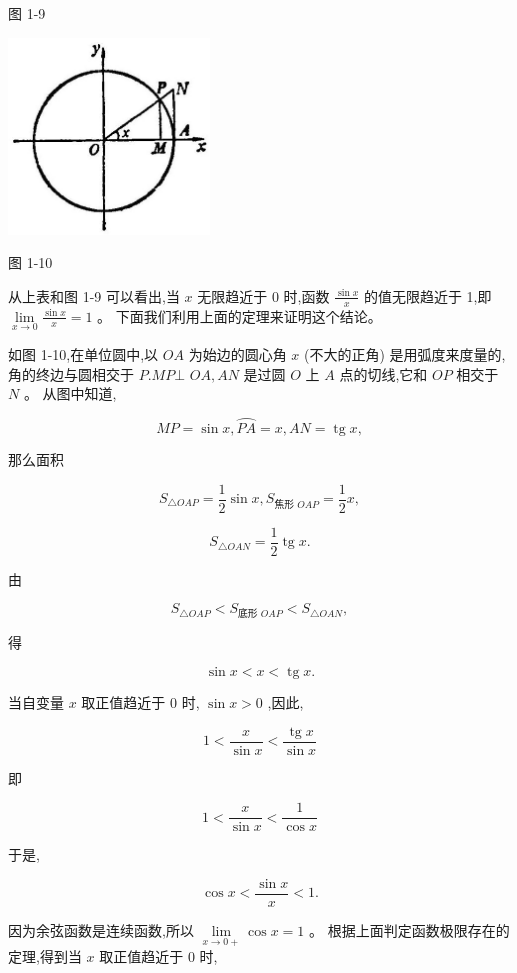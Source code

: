 \documentclass[lang=cn,newtx,12pt,scheme=chinese]{elegantbook}
\begin{document}
图 1-9

\begin{center}
	\includegraphics[max width=0.4\textwidth]{images/01912c18-5c3f-733d-b775-749ba9897a9d_42_838953.jpg}
\end{center}

图 1-10

从上表和图 1-9 可以看出,当 \(x\) 无限趋近于 0 时,函数 \(\frac{\sin x}{x}\) 的值无限趋近于 1,即 \(\mathop{\lim }\limits_{{x \rightarrow 0}}\frac{\sin x}{x} = 1\) 。 下面我们利用上面的定理来证明这个结论。

如图 1-10,在单位圆中,以 \({OA}\) 为始边的圆心角 \(x\) (不大的正角) 是用弧度来度量的,角的终边与圆相交于 \(P.{MP} \bot\) \({OA},{AN}\) 是过圆 \(O\) 上 \(A\) 点的切线,它和 \({OP}\) 相交于 \(N\) 。 从图中知道,

\[
{MP} = \sin x,\overset{⏜}{PA} = x,{AN} = \operatorname{tg}x,
\]

那么面积

\[
{S}_{\bigtriangleup {OAP}} = \frac{1}{2}\sin x,{S}_{\text{焦形 }{OAP}} = \frac{1}{2}x,
\]

\[
{S}_{\bigtriangleup {OAN}} = \frac{1}{2}\operatorname{tg}x.
\]

由

\[
{S}_{\bigtriangleup {OAP}} < {S}_{\text{底形 }{OAP}} < {S}_{\bigtriangleup {OAN}},
\]

得

\[
\sin x < x < \operatorname{tg}x\text{.}
\]

当自变量 \(x\) 取正值趋近于 0 时, \(\sin x > 0\) ,因此,

\[
1 < \frac{x}{\sin x} < \frac{\operatorname{tg}x}{\sin x}
\]

即

\[
1 < \frac{x}{\sin x} < \frac{1}{\cos x}
\]

于是,

\[
\cos x < \frac{\sin x}{x} < 1\text{.}
\]

因为余弦函数是连续函数,所以 \(\mathop{\lim }\limits_{{x \rightarrow 0 + }}\cos x = 1\) 。 根据上面判定函数极限存在的定理,得到当 \(x\) 取正值趋近于 0 时,
\end{document}
